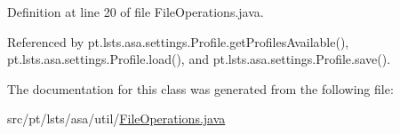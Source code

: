 Definition at line 20 of file File\+Operations.\+java.



Referenced by pt.\+lsts.\+asa.\+settings.\+Profile.\+get\+Profiles\+Available(), pt.\+lsts.\+asa.\+settings.\+Profile.\+load(), and pt.\+lsts.\+asa.\+settings.\+Profile.\+save().



The documentation for this class was generated from the following file\+:\begin{DoxyCompactItemize}
\item 
src/pt/lsts/asa/util/\hyperlink{FileOperations_8java}{File\+Operations.\+java}\end{DoxyCompactItemize}
